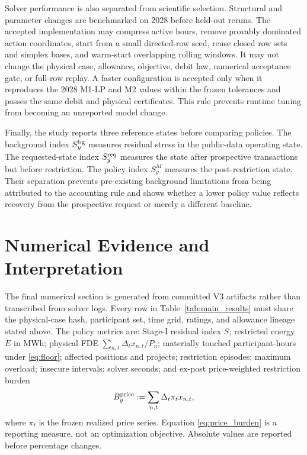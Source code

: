 \documentclass[10pt,journal]{IEEEtran}
\begin{document}
Solver performance is also separated from scientific selection. Structural and parameter changes are benchmarked on 2028 before held-out reruns. The accepted implementation may compress active hours, remove provably dominated action coordinates, start from a small directed-row seed, reuse closed row sets and simplex bases, and warm-start overlapping rolling windows. It may not change the physical case, allowance, objective, debit law, numerical acceptance gate, or full-row replay. A faster configuration is accepted only when it reproduces the 2028 M1-LP and M2 values within the frozen tolerances and passes the same debit and physical certificates. This rule prevents runtime tuning from becoming an unreported model change.

Finally, the study reports three reference states before comparing policies. The background index $S_y^{\rm bg}$ measures residual stress in the public-data operating state. The requested-state index $S_y^{\rm req}$ measures the state after prospective transactions but before restriction. The policy index $S_y^M$ measures the post-restriction state. Their separation prevents pre-existing background limitations from being attributed to the accounting rule and shows whether a lower policy value reflects recovery from the prospective request or merely a different baseline.

\section{Numerical Evidence and Interpretation}
\label{sec:results}

The final numerical section is generated from committed V3 artifacts rather than transcribed from solver logs. Every row in Table~\ref{tab:main_results} must share the physical-case hash, participant set, time grid, ratings, and allowance lineage stated above. The policy metrics are: Stage-I residual index $S$; restricted energy $E$ in MWh; physical FDE $\sum_{n,t}\Delta_tx_{n,t}/P_n$; materially touched participant-hours under \eqref{eq:floor}; affected positions and projects; restriction episodes; maximum overload; insecure intervals; solver seconds; and ex-post price-weighted restriction burden
\begin{equation}
B_y^{\rm price}:=
\sum_{n,t}\Delta_t\pi_t x_{n,t},
\label{eq:price_burden}
\end{equation}
where $\pi_t$ is the frozen realized price series. Equation \eqref{eq:price_burden} is a reporting measure, not an optimization objective. Absolute values are reported before percentage changes.
\end{document}
